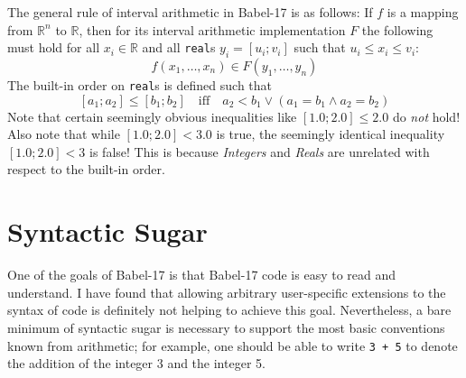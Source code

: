 \documentclass[11pt]{amsart}
\begin{document}
The general rule of interval arithmetic in Babel-17 is as follows: If $f$ is a mapping from $\mathbb{R}^n$ to $\mathbb{R}$, then for its interval arithmetic implementation $F$ the following must hold for all $x_i \in \mathbb{R}$ and all \texttt{real}s $y_i = [u_i; v_i]$ such that $u_i \le x_i \le v_i$:
\[
f(x_1, \ldots, x_n) \in F(y_1, \ldots, y_n) 
\]
The built-in order on \texttt{real}s is defined such that
\[
[a_1; a_2] \leq [b_1; b_2] \quad\text{iff}\quad a_2 < b_1 \vee (a_1 = b_1 \wedge a_2 = b_2)
\]
Note that certain seemingly obvious inequalities like $[1.0; 2.0] \leq 2.0$ do \emph{not} hold! Also note that while $[1.0; 2.0] < 3.0$ is true, the seemingly identical inequality $[1.0; 2.0] < 3$ is false! This is because \emph{Integers} and \emph{Reals} are unrelated with respect to the built-in order. 

\section{Syntactic Sugar}
One of the goals of Babel-17 is that Babel-17 code is easy to read and understand. I have found that allowing arbitrary user-specific extensions to the syntax of code is definitely not helping to achieve this goal. Nevertheless, a bare minimum of syntactic sugar is necessary to support the most basic conventions known from arithmetic; for example, one should be able to write \texttt{3 + 5} to denote the addition of the integer 3 and the integer 5.
\end{document}
